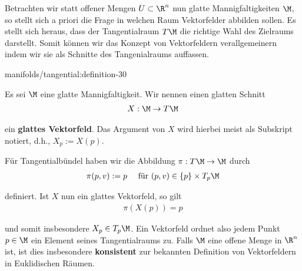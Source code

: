 \documentclass[letterpaper,10pt,german]{jupyterBook}
\begin{document}
\par
Betrachten wir statt offener Mengen \(U\subset\R^n\) nun glatte Mannigfaltigkeiten \(\M\), so stellt sich a priori die Frage in welchen Raum Vektorfelder abbilden sollen.
Es stellt sich heraus, dass der Tangentialraum \(T\M\) die richtige Wahl des Zielraums darstellt.
Somit können wir das Konzept von Vektorfeldern verallgemeinern indem wir sie als Schnitte des Tangenialraums auffassen.
\begin{definition}{}{manifolds/tangential:definition-30}



\par
Es sei \(\M\) eine glatte Mannigfaltigkeit.
Wir nennen einen glatten Schnitt
\begin{align*}
X:\M\to T\M
\end{align*}
\par
ein \textbf{glattes Vektorfeld}.
Das Argument von \(X\) wird hierbei meist als Subskript notiert, d.h., \(X_p := X(p)\).
\end{definition}

\par
Für Tangentialbündel haben wir die Abbildung \(\pi:T\M\to\M\) durch
\begin{align*}
\pi(p,v):= p\quad\text{ für } (p,v)\in\{p\}\times T_p\M
\end{align*}
\par
definiert.
Ist \(X\) nun ein glattes Vektorfeld, so gilt
\begin{align*}
\pi(X(p)) = p
\end{align*}
\par
und somit insbesondere \(X_p\in T_p\M\).
Ein Vektorfeld ordnet also jedem Punkt \(p\in\M\) ein Element seines Tangentialraums zu.
Falls \(\M\) eine offene Menge in \(\R^n\) ist, ist dies insbesondere \textbf{konsistent} zur bekannten Definition von Vektorfeldern in Euklidischen Räumen.
\end{document}

